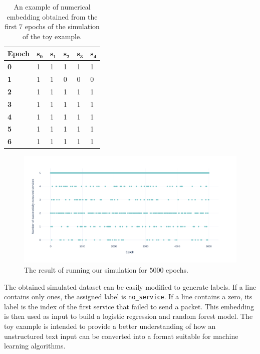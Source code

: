 \begin{table}[!h]
\centering
\begin{tabular}{@{}p{1.5cm}p{1.5cm}p{1.5cm}p{1.5cm}p{1.5cm}p{1.5cm}@{}}
\toprule
Epoch      & $\mathbf{s_0}$ & $\mathbf{s_1}$ & $\mathbf{s_2}$ & $\mathbf{s_3}$ & $\mathbf{s_4}$ \\ \toprule
\textbf{0} & 1             & 1             & 1             & 1             & 1             \\
\textbf{1} & 1             & 1             & 0             & 0             & 0             \\
\textbf{2} & 1             & 1             & 1             & 1             & 1             \\
\textbf{3} & 1             & 1             & 1             & 1             & 1             \\
\textbf{4}          & 1             & 1             & 1             & 1             & 1             \\
\textbf{5}          & 1             & 1             & 1             & 1             & 1             \\
\textbf{6}          & 1             & 1             & 1             & 1             & 1             \\ \bottomrule
\end{tabular}
\caption{An example of numerical embedding obtained from the first $7$ epochs of the simulation of the toy example.}\label{tab:simulation}
\end{table}

\begin{figure}[!h]
        \centerline{\includegraphics[scale=.5]{img/dummy_data_plot.pdf}}
        \caption{The result of running our simulation for $5000$ epochs.}
        \label{fig:simulationPlot}
\end{figure}

The obtained simulated dataset can be easily modified to generate labels. If a line contains only ones, the assigned label is \texttt{no\_service}. If a line contains a zero, its label is the index of the first service that failed to send a packet. This embedding is then used as input to build a logistic regression and random forest model. The toy example is intended to provide a better understanding of how an unstructured text input can be converted into a format suitable for machine learning algorithms.

